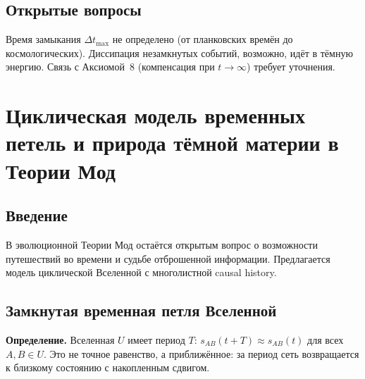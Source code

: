 \documentclass[12pt,a4paper]{article}
\begin{document}
\subsection{Открытые вопросы}
Время замыкания $\Delta t_{\max}$ не определено (от планковских времён до космологических). Диссипация незамкнутых событий, возможно, идёт в тёмную энергию. Связь с Аксиомой~8 (компенсация при $t\to\infty$) требует уточнения.

\newpage
\section{Циклическая модель временных петель и природа тёмной материи в Теории Мод}

\begin{abstract}
Предложено расширение эволюционной Теории Мод, в котором время Вселенной рассматривается как замкнутая причинная петля, а causal history частиц --- как многолистная структура, где активен только один лист. Путешествие во времени интерпретируется не как перемещение, а как переключение активного листа causal history. Показано, что отброшенные листы не исчезают в силу закона сохранения информации, а формируют нескомпенсированную интерференционную картину, которая естественным образом объясняет наблюдаемые свойства тёмной материи: профиль гало $\rho \propto 1/r^2$, отсутствие электромагнитного взаимодействия и наличие гравитационного.

\bigskip
\noindent\textbf{Ключевые слова:} Теория Мод, замкнутые временные петли, causal history, тёмная материя, сохранение информации.
\end{abstract}

\subsection{Введение}
В эволюционной Теории Мод остаётся открытым вопрос о возможности путешествий во времени и судьбе отброшенной информации. Предлагается модель циклической Вселенной с многолистной causal history.

\subsection{Замкнутая временная петля Вселенной}
\textbf{Определение.} Вселенная $U$ имеет период $T$: $s_{AB}(t+T) \approx s_{AB}(t)$ для всех $A,B \in U$. Это не точное равенство, а приближённое: за период сеть возвращается к близкому состоянию с накопленным сдвигом.
\end{document}
